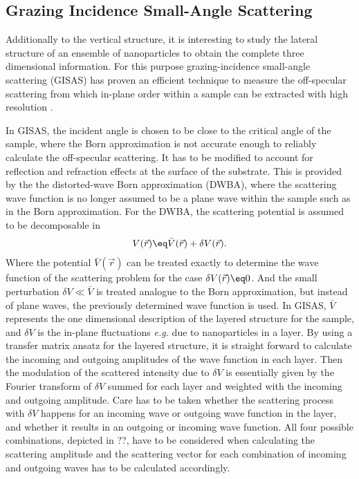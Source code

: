 \documentclass[\main/dresen_thesis.tex]{subfiles}
\begin{document}
  \subsection{Grazing Incidence Small-Angle Scattering}\label{sec:theoreticalBackground:scattering:GISAS}
    Additionally to the vertical structure, it is interesting to study the lateral structure of an ensemble of nanoparticles to obtain the complete three dimensional information.
    For this purpose grazing-incidence small-angle scattering (GISAS) has proven an efficient technique to measure the off-specular scattering from which in-plane order within a sample can be extracted with high resolution \cite{Renaud_2009_Probi}.

    In GISAS, the incident angle is chosen to be close to the critical angle of the sample, where the Born approximation is not accurate enough to reliably calculate the off-specular scattering.
    It has to be modified to account for reflection and refraction effects at the surface of the substrate.
    This is provided by the the distorted-wave Born approximation (DWBA), where the scattering wave function is no longer assumed to be a plane wave within the sample such as in the Born approximation.
    For the DWBA, the scattering potential is assumed to be decomposable in
    \begin{align}
      V(\vec{r}) \eq \bar{V}(\vec{r}) + \delta V(\vec{r}).
    \end{align}
    Where the potential $\bar{V}(\vec{r})$ can be treated exactly to determine the wave function of the scattering problem for the case $\delta V(\vec{r})\eq 0$.
    And the small perturbation $\delta V \ll \bar{V}$ is treated analogue to the Born approximation, but instead of plane waves, the previously determined wave function is used.
    In GISAS, $\bar{V}$ represents the one dimensional description of the layered structure for the sample, and $\delta V$ is the in-plane fluctuations \textit{e.g.} due to nanoparticles in a layer.
    By using a transfer matrix ansatz for the layered structure, it is straight forward to calculate the incoming and outgoing amplitudes of the wave function in each layer.
    Then the modulation of the scattered intensity due to $\delta V$ is essentially given by the Fourier transform of $\delta V$ summed for each layer and weighted with the incoming and outgoing amplitude.
    Care has to be taken whether the scattering process with $\delta V$ happens for an incoming wave or outgoing wave function in the layer, and whether it results in an outgoing or incoming wave function.
    All four possible combinations, depicted in ??, have to be considered when calculating the scattering amplitude and the scattering vector for each combination of incoming and outgoing waves has to be calculated accordingly.
\end{document}
